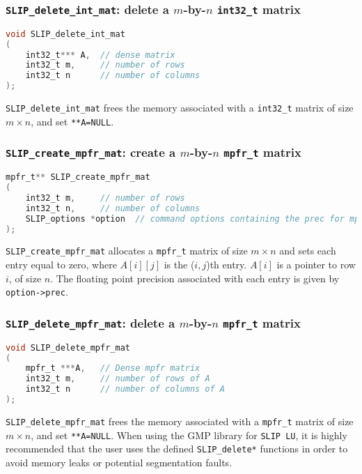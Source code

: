 \documentclass[12pt]{article}
\theoremstyle{definition}
\begin{document}
\cprotect\subsubsection{\verb|SLIP_delete_int_mat|: delete a $m$-by-$n$ \verb|int32_t| matrix}


\begin{lstlisting}[language=C,frame=single]
void SLIP_delete_int_mat
(
    int32_t*** A,  // dense matrix
    int32_t m,     // number of rows
    int32_t n      // number of columns
);
\end{lstlisting}

\verb|SLIP_delete_int_mat| frees the memory associated with a \verb|int32_t| matrix of size $m \times n$, and set \verb|**A=NULL|.

\cprotect\subsubsection{\verb|SLIP_create_mpfr_mat|: create a $m$-by-$n$ \verb|mpfr_t| matrix}
\label{ss:create_mpfr_mat}


\begin{lstlisting}[language=C,frame=single]
mpfr_t** SLIP_create_mpfr_mat
(
    int32_t m,     // number of rows
    int32_t n,     // number of columns
    SLIP_options *option  // command options containing the prec for mpfr
);
\end{lstlisting}

\verb|SLIP_create_mpfr_mat| allocates a \verb|mpfr_t| matrix of size $m \times n$ and sets each entry equal to zero, where $A[i][j]$ is the ($i,j$)th entry. $A[i]$ is a pointer to row $i$, of size $n$. The floating point precision associated with each entry is given by \verb|option->prec|.


\cprotect\subsubsection{\verb|SLIP_delete_mpfr_mat|: delete a $m$-by-$n$ \verb|mpfr_t| matrix}


\begin{lstlisting}[language=C,frame=single]
void SLIP_delete_mpfr_mat
(
    mpfr_t ***A,   // Dense mpfr matrix
    int32_t m,     // number of rows of A
    int32_t n      // number of columns of A
);
\end{lstlisting}

\verb|SLIP_delete_mpfr_mat| frees the memory associated with a \verb|mpfr_t| matrix of size $m \times n$, and set \verb|**A=NULL|. When using the GMP library for \verb|SLIP LU|, it is highly recommended that the user uses the defined \verb|SLIP_delete*| functions in order to avoid memory leaks or potential segmentation faults.
\end{document}
